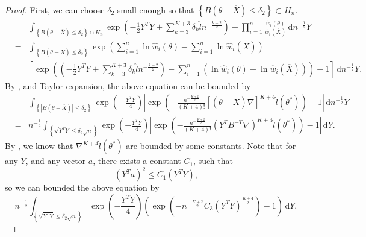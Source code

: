 \documentclass[oneside,english]{amsbook}
\numberwithin{section}{chapter}
\numberwithin{equation}{section}
\numberwithin{figure}{section}
\theoremstyle{plain}
\theoremstyle{plain}
\theoremstyle{definition}
\theoremstyle{plain}
\theoremstyle{plain}
\theoremstyle{remark}
\theoremstyle{definition}
\theoremstyle{definition}
\newcommand{\diff}{\,\mathrm{d}}
\begin{document}
\begin{proof}
First, we can choose $\delta_{2}$ small enough so that $\left\{ B\left(\theta-\overline{X}\right)\le\delta_{2}\right\} \subset H_{n}$.
\begin{eqnarray*}
 &  & \int_{\left\{ B\left(\theta-\overline{X}\right)\le\delta_{2}\right\} \cap H_{n}}\exp\left(-\frac{1}{2}Y^{T}Y+\sum_{k=3}^{K+3}\delta_{k}\hat{l}n^{-\frac{k-2}{2}}\right)-\prod_{i=1}^{n}\frac{\hat{w}_{i}\left(\theta\right)}{\hat{w}_{i}\left(\overline{X}\right)}\diff n^{-\frac{1}{2}}Y\\
 & = & \int_{\left\{ B\left(\theta-\overline{X}\right)\le\delta_{2}\right\} }\exp\left(\sum_{i=1}^{n}\ln\hat{w}_{i}\left(\theta\right)-\sum_{i=1}^{n}\ln\hat{w}_{i}\left(\overline{X}\right)\right)\\
 &  & \left[\exp\left(\left(-\frac{1}{2}Y^{T}Y+\sum_{k=3}^{K+3}\delta_{k}\hat{l}n^{-\frac{k-2}{2}}\right)-\sum_{i=1}^{n}\left(\ln\hat{w}_{i}\left(\theta\right)-\ln\hat{w}_{i}\left(\overline{X}\right)\right)\right)-1\right]\diff n^{-\frac{1}{2}}Y.
\end{eqnarray*}
By , and Taylor expansion, the
above equation can be bounded by 
\begin{eqnarray*}
 &  & \int_{\left\{ \left|B\left(\theta-\overline{X}\right)\right|\le\delta_{2}\right\} }\exp\left(-\frac{Y^{T}Y}{4}\right)\left|\exp\left(-\frac{n^{-\frac{K+2}{2}}}{\left(K+4\right)!}\left[\left(\theta-\overline{X}\right)\nabla\right]^{K+4}\hat{l}\left(\theta^{*}\right)\right)-1\right|\diff n^{-\frac{1}{2}}Y\\
 & = & n^{-\frac{1}{2}}\int_{\left\{ \sqrt{Y^{T}Y}\le\delta_{2}\sqrt{n}\right\} }\exp\left(-\frac{Y^{T}Y}{4}\right)\left|\exp\left(-\frac{n^{-\frac{K+2}{2}}}{\left(K+4\right)!}\left(Y^{T}B^{-T}\nabla\right)^{K+4}\hat{l}\left(\theta^{*}\right)\right)-1\right|\diff Y.
\end{eqnarray*}
By , we know that $\nabla^{K+4}\hat{l}\left(\theta^{*}\right)$
are bounded by some constants. Note that for any $Y$, and any vector
$a$, there exists a constant $C_{1}$, such that 
\begin{equation}
\left(Y^{T}a\right)^{2}\le C_{1}\left(Y^{T}Y\right),\label{eq:average-inequality}
\end{equation}
so we can bounded the above equation by 
\[
n^{-\frac{1}{2}}\int_{\left\{ \sqrt{Y^{T}Y}\le\delta_{2}\sqrt{n}\right\} }\exp\left(-\frac{Y^{T}Y}{4}\right)\left(\exp\left(-n^{-\frac{K+2}{2}}C_{3}\left(Y^{T}Y\right)^{\frac{K+4}{2}}\right)-1\right)\diff Y,
\]
\end{proof}
\end{document}
